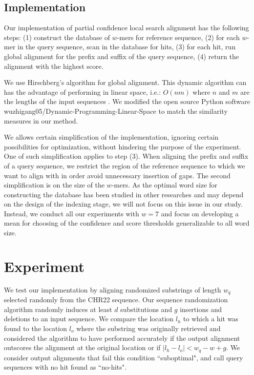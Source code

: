 \documentclass{article}
\begin{document}
\subsection{Implementation}

Our implementation of partial confidence local search alignment has the following steps: (1) construct the database of $w$-mers for reference sequence, (2) for each $w$-mer in the query sequence, scan in the database for hits, (3) for each hit, run global alignment for the prefix and suffix of the query sequence, (4) return the alignment with the highest score. 

We use Hirschberg's algorithm for global alignment. This dynamic algorithm can has the advantage of performing in linear space, i.e.: $O(nm)$ where $n$ and $m$ are the lengths of the input sequences \cite{global_align}. We modified the open source Python software wuzhigang05/Dynamic-Programming-Linear-Space to match the similarity measures in our method. 

We allows certain simplification of the implementation, ignoring certain possibilities for optimization, without hindering the purpose of the experiment. One of such simplification applies to step (3). When aligning the prefix and suffix of a query sequence, we restrict the region of the reference sequence to which we want to align with in order avoid unnecessary insertion of gaps. The second simplification is on the size of the $w$-mers. As the optimal word size for constructing the database has been studied in other researches and may depend on the design of the indexing stage, we will not focus on this issue in our study. Instead, we conduct all our experiments with $w=7$ and focus on developing a mean for choosing of the confidence and score thresholds generalizable to all word size. 

\section{Experiment}

We test our implementation by aligning randomized substrings of length $w_q$ selected randomly from the CHR22 sequence. Our sequence randomization algorithm randomly induces at least $d$ substitutions and $g$ insertions and deletions to an input sequence. We compare the location $l_h$ to which a hit was found to the location $l_o$ where the substring was originally retrieved and considered the algorithm to have performed accurately if the output alignment outscores the alignment at the original location or if $|l_h - l_o| < w_q - w + g$. We consider output alignments that fail this condition ``suboptimal", and call query sequences with no hit found as ``no-hits".
\end{document}
